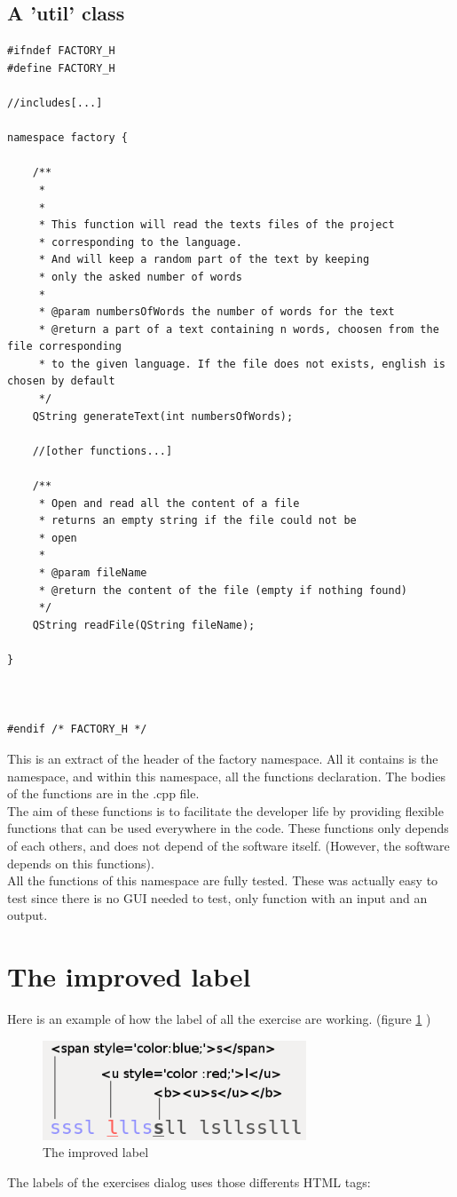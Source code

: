 \subsection{A 'util' class}

\begin{lstlisting}
#ifndef FACTORY_H
#define FACTORY_H

//includes[...]

namespace factory {
    
    /**
     * 
     * 
     * This function will read the texts files of the project
     * corresponding to the language.
     * And will keep a random part of the text by keeping 
     * only the asked number of words
     * 
     * @param numbersOfWords the number of words for the text
     * @return a part of a text containing n words, choosen from the file corresponding
     * to the given language. If the file does not exists, english is chosen by default
     */
    QString generateText(int numbersOfWords);

    //[other functions...]

    /**
     * Open and read all the content of a file
     * returns an empty string if the file could not be
     * open
     *
     * @param fileName
     * @return the content of the file (empty if nothing found)
     */
    QString readFile(QString fileName);

}



#endif /* FACTORY_H */
\end{lstlisting}
This is an extract of the header of the factory namespace. All it contains is the namespace, and within this namespace, all the functions declaration. The bodies of the functions are in the .cpp file.\\
The aim of these functions is to facilitate the developer life by providing flexible functions that can be used everywhere in the code. These functions only depends of each others, and does not depend of the software itself. (However, the software depends on this functions).\\
All the functions of this namespace are fully tested. These was actually easy to test since there is no GUI needed to test, only function with an input and an output.


\section{The improved label}
Here is an example of how the label of all the exercise are working. (figure \ref{improved-label} )
\begin{figure}[H]
	\centering
	\includegraphics[width=0.7\textwidth]{images/dialog-learn-1.png}
	 \caption{The improved label}
	 \label{improved-label}
\end{figure}
The labels of the exercises dialog uses those differents HTML tags:

